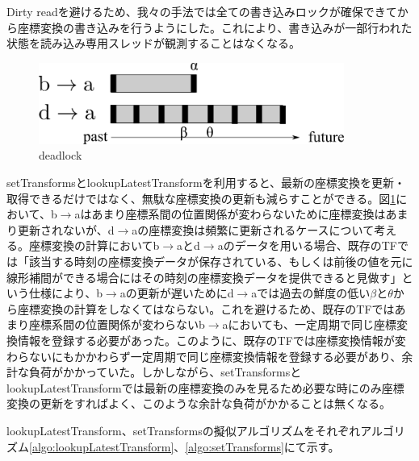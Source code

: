 \documentclass[a4paper]{jreport}	%
\begin{document}
Dirty readを避けるため、我々の手法では全ての書き込みロックが確保できてから座標変換の書き込みを行うようにした。これにより、書き込みが一部行われた状態を読み込み専用スレッドが観測することはなくなる。

\begin{figure}[h] 
\centering
\includegraphics[width=10cm]{need-many-update}
\caption{deadlock}
\label{fig:need-many-update}
\end{figure}


setTransformsとlookupLatestTransformを利用すると、最新の座標変換を更新・取得できるだけではなく、無駄な座標変換の更新も減らすことができる。図\ref{fig:need-many-update}において、b$\rightarrow$aはあまり座標系間の位置関係が変わらないために座標変換はあまり更新されないが、d$\rightarrow$aの座標変換は頻繁に更新されるケースについて考える。座標変換の計算においてb$\rightarrow$aとd$\rightarrow$aのデータを用いる場合、既存のTFでは「該当する時刻の座標変換データが保存されている、もしくは前後の値を元に線形補間ができる場合にはその時刻の座標変換データを提供できると見做す」という仕様により、b$\rightarrow$aの更新が遅いためにd$\rightarrow$aでは過去の鮮度の低い$\beta$と$\theta$から座標変換の計算をしなくてはならない。これを避けるため、既存のTFではあまり座標系間の位置関係が変わらないb$\rightarrow$aにおいても、一定周期で同じ座標変換情報を登録する必要があった。このように、既存のTFでは座標変換情報が変わらないにもかかわらず一定周期で同じ座標変換情報を登録する必要があり、余計な負荷がかかっていた。しかしながら、setTransformsと
lookupLatestTransformでは最新の座標変換のみを見るため必要な時にのみ座標変換の更新をすればよく、このような余計な負荷がかかることは無くなる。


lookupLatestTransform、setTransformsの擬似アルゴリズムをそれぞれアルゴリズム\ref{algo:lookupLatestTransform}、\ref{algo:setTransforms}にて示す。
\end{document}
